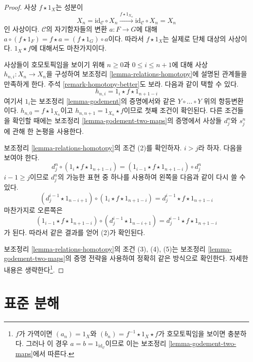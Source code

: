 \begin{proof}
사상 $f \star 1_X$는 성분이
$$
X_n = \text{id}_\mathcal{C} \circ X_n
\xrightarrow{f \star 1_{X_n}}
\text{id}_\mathcal{C} \circ X_n = X_n
$$
인 사상이다. $\mathcal{C}$의 자기함자들의 변환 $a : F \to G$에 대해
$a \circ (f \star 1_F) = f \star a = (f \star 1_G) \circ a$이다.
따라서 $f \star 1_X$는 실제로 단체 대상의 사상이다.
$1_X \star f$에 대해서도 마찬가지이다.

\medskip\noindent
사상들이 호모토픽임을 보이기 위해 $n \geq 0$과
$0 \leq i \leq n + 1$에 대해 사상 $h_{n, i} : X_n \to X_n$을
구성하여 보조정리 \ref{lemma-relations-homotopy}에 설명된 관계들을
만족하게 한다. 주석 \ref{remark-homotopy-better}도 보라. 다음과 같이
택할 수 있다.
$$
h_{n, i} = 1_i \star f \star 1_{n + 1 - i}
$$
여기서 $1_i$는 보조정리 \ref{lemma-godement}의 증명에서와 같은
$Y \circ \ldots \circ Y$ 위의 항등변환이다.
$h_{n, 0} = f \star 1_{X_n}$이고
$h_{n, n + 1} = 1_{X_n} \star f$이므로 첫째 조건이 확인된다. 다른
조건들을 확인할 때에는 보조정리 \ref{lemma-godement-two-maps}의
증명에서 사상들 $d^n_j$와 $s^n_j$에 관해 한 논평을 사용한다.

\medskip\noindent
보조정리 \ref{lemma-relations-homotopy}의 조건 (2)를 확인하자.
$i > j$라 하자. 다음을 보여야 한다.
$$
d^n_j \circ (1_i \star f \star 1_{n + 1 - i}) =
(1_{i - 1} \star f \star 1_{n + 1 - i}) \circ d^n_j
$$
$i - 1 \geq j$이므로 $d^n_j$의 가능한 표현 중 하나를 사용하여
왼쪽을 다음과 같이 다시 쓸 수 있다.
$$
(d^{i - 1}_j \star 1_{n - i + 1}) \circ (1_i \star f \star 1_{n + 1 - i}) =
d^{i - 1}_j \star f \star 1_{n + 1 - i}
$$
마찬가지로 오른쪽은
$$
(1_{i - 1} \star f \star 1_{n + 1 - i}) \circ
(d^{i - 1}_j \star 1_{n - i + 1}) =
d^{i - 1}_j \star f \star 1_{n + 1 - i}
$$
가 된다. 따라서 같은 결과를 얻어 (2)가 확인된다.

\medskip\noindent
보조정리 \ref{lemma-relations-homotopy}의 조건 (3), (4), (5)는
보조정리 \ref{lemma-godement-two-maps}의 증명 전략을 사용하여 정확히
같은 방식으로 확인한다. 자세한 내용은 생략한다\footnote{$f$가
가역이면 $(a_n) = 1_X$와
$(b_n) = f^{-1} \star 1_X \star f$가 호모토픽임을 보이면 충분하다.
그러나 이 경우 $a = b = 1_{\text{id}_\mathcal{C}}$이므로 이는 보조정리
\ref{lemma-godement-two-maps}에서 따른다.}.
\end{proof}






\section{표준 분해}
\label{section-standard}

